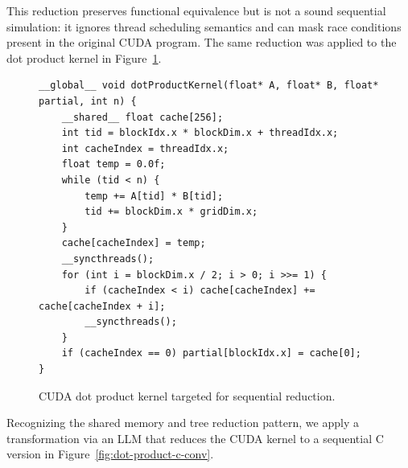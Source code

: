 \documentclass{article}
\begin{document}
This reduction preserves functional equivalence but is not a sound sequential simulation: it ignores thread scheduling semantics and can mask race conditions present in the original CUDA program. The same reduction was applied to the dot product kernel in Figure~\ref{fig:dot-product-kernel-1}.

\begin{figure}[H]
\begin{verbatim}
__global__ void dotProductKernel(float* A, float* B, float* partial, int n) {
    __shared__ float cache[256];
    int tid = blockIdx.x * blockDim.x + threadIdx.x;
    int cacheIndex = threadIdx.x;
    float temp = 0.0f;
    while (tid < n) {
        temp += A[tid] * B[tid];
        tid += blockDim.x * gridDim.x;
    }
    cache[cacheIndex] = temp;
    __syncthreads();
    for (int i = blockDim.x / 2; i > 0; i >>= 1) {
        if (cacheIndex < i) cache[cacheIndex] += cache[cacheIndex + i];
        __syncthreads();
    }
    if (cacheIndex == 0) partial[blockIdx.x] = cache[0];
}
\end{verbatim}
\caption{CUDA dot product kernel targeted for sequential reduction.}
\label{fig:dot-product-kernel-1}
\end{figure}

Recognizing the shared memory and tree reduction pattern, we apply a transformation via an LLM that reduces the CUDA kernel to a sequential C version in Figure~\ref{fig:dot-product-c-conv}.
\end{document}
